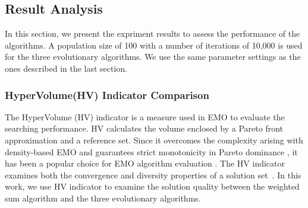 \documentclass[10pt,journal,compsoc]{IEEEtran}
\newcommand{\Fig}[1]{Fig.~\ref{#1}}
\begin{document}
%

\subsection{Result Analysis}\label{resultanalyssi}
In this section, we present the expriment results to assess the performance of the algorithms.
A population size of 100 with a number of iterations of 10,000 is used for the three evolutionary algorithms. We use the same parameter settings as the ones described in the last section. %


\subsubsection{HyperVolume(HV) Indicator Comparison}
The HyperVolume (HV) indicator \cite{Auger:2009:THI:1527125.1527138} is a measure used in EMO to evaluate the searching performance. HV calculates the volume enclosed by a Pareto front approximation and a reference set. Since it overcomes the complexity arising with density-based EMO \cite{wagner2007pareto} and guarantees strict monotonicity in Pareto dominance \cite{fleischer2003measure}, it has been a popular choice for EMO algorithm evaluation \cite{knowles2003properties,emmerich2005emo}. 
The HV indicator examines both the convergence and diversity properties of a solution set~\cite{Auger:2009:THI:1527125.1527138}. In this work, we use HV indicator to examine the solution quality between the weighted sum algorithm and the three evolutionary algorithms. 
\end{document}
